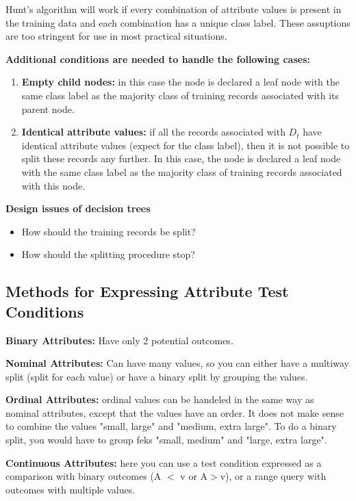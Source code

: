 		Hunt's algorithm will work if every combination of attribute values is present
		in the training data and each combination has a unique class label. 
		These assuptions are too stringent for use in most practical situations.

		{\bf Additional conditions are needed to handle the following cases:}

		\begin{enumerate}
			\item {\bf Empty child nodes:} in this case the node is declared a leaf
			node with the same class label as the majority class of training records
			associated with its parent node. 
			\item{\bf Identical attribute values:} if all the records associated with
			$D_{t}$ have identical attribute values (expect for the class label), then
			it is not possible to split these records any further. In this case, the node is
			declared a leaf node with the same class label as the majority class of 
			training records associated with this node.
		\end{enumerate}

		{\bf Design issues of decision trees}
			\begin{itemize}
				\item How should the training records be split?
				\item How should the splitting procedure stop?
			\end{itemize}

	\subsection{Methods for Expressing Attribute Test Conditions}

		{\bf Binary Attributes:} Have only 2 potential outcomes.

		{\bf Nominal Attributes:} Can have many values, so you can either have
		a multiway split (split for each value) or have a binary split by grouping
		the values. 

		{\bf Ordinal Attributes:} ordinal values can be handeled in the same way as
		nominal attributes, except that the values have an order. It does not make
		sense to combine the values "small, large" and "medium, extra large". To do
		a binary split, you would have to group feks "small, medium" and "large, extra large".

		{\bf Continuous Attributes:} here you can use a test condition expressed as a
		comparison with binary outcomes (A $<$ v or A$>$v), or a range query with outcomes 
		with multiple values. 

